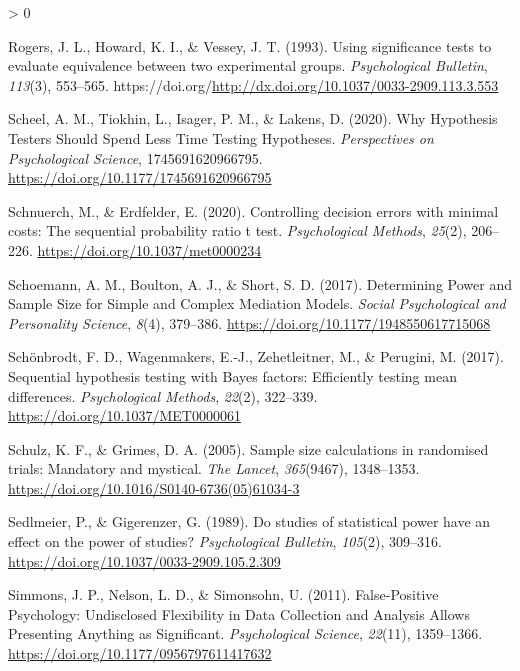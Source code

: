 \documentclass[
  english,
  ,jou,floatsintext]{apa6}
\newlength{\cslhangindent}
\newenvironment{CSLReferences}[2] %
 {%
  \setlength{\parindent}{0pt}
  \ifodd #1 \everypar{\setlength{\hangindent}{\cslhangindent}}\ignorespaces\fi
  \ifnum #2 > 0
  \setlength{\parskip}{#2\baselineskip}
  \fi
 }%
 {}
\begin{document}
\begin{CSLReferences}{1}{0}
\leavevmode\hypertarget{ref-rogers_using_1993}{}%
Rogers, J. L., Howard, K. I., \& Vessey, J. T. (1993). Using significance tests to evaluate equivalence between two experimental groups. \emph{Psychological Bulletin}, \emph{113}(3), 553--565. https://doi.org/\url{http://dx.doi.org/10.1037/0033-2909.113.3.553}

\leavevmode\hypertarget{ref-scheel_why_2020}{}%
Scheel, A. M., Tiokhin, L., Isager, P. M., \& Lakens, D. (2020). Why {Hypothesis Testers Should Spend Less Time Testing Hypotheses}. \emph{Perspectives on Psychological Science}, 1745691620966795. \url{https://doi.org/10.1177/1745691620966795}

\leavevmode\hypertarget{ref-schnuerch_controlling_2020}{}%
Schnuerch, M., \& Erdfelder, E. (2020). Controlling decision errors with minimal costs: {The} sequential probability ratio t test. \emph{Psychological Methods}, \emph{25}(2), 206--226. \url{https://doi.org/10.1037/met0000234}

\leavevmode\hypertarget{ref-schoemann_determining_2017}{}%
Schoemann, A. M., Boulton, A. J., \& Short, S. D. (2017). Determining {Power} and {Sample Size} for {Simple} and {Complex Mediation Models}. \emph{Social Psychological and Personality Science}, \emph{8}(4), 379--386. \url{https://doi.org/10.1177/1948550617715068}

\leavevmode\hypertarget{ref-schonbrodt_sequential_2017}{}%
Schönbrodt, F. D., Wagenmakers, E.-J., Zehetleitner, M., \& Perugini, M. (2017). Sequential hypothesis testing with {Bayes} factors: {Efficiently} testing mean differences. \emph{Psychological Methods}, \emph{22}(2), 322--339. \url{https://doi.org/10.1037/MET0000061}

\leavevmode\hypertarget{ref-schulz_sample_2005}{}%
Schulz, K. F., \& Grimes, D. A. (2005). Sample size calculations in randomised trials: Mandatory and mystical. \emph{The Lancet}, \emph{365}(9467), 1348--1353. \url{https://doi.org/10.1016/S0140-6736(05)61034-3}

\leavevmode\hypertarget{ref-sedlmeier_studies_1989}{}%
Sedlmeier, P., \& Gigerenzer, G. (1989). Do studies of statistical power have an effect on the power of studies? \emph{Psychological Bulletin}, \emph{105}(2), 309--316. \url{https://doi.org/10.1037/0033-2909.105.2.309}

\leavevmode\hypertarget{ref-simmons_false-positive_2011}{}%
Simmons, J. P., Nelson, L. D., \& Simonsohn, U. (2011). False-{Positive Psychology}: {Undisclosed Flexibility} in {Data Collection} and {Analysis Allows Presenting Anything} as {Significant}. \emph{Psychological Science}, \emph{22}(11), 1359--1366. \url{https://doi.org/10.1177/0956797611417632}


\end{CSLReferences}
\end{document}
